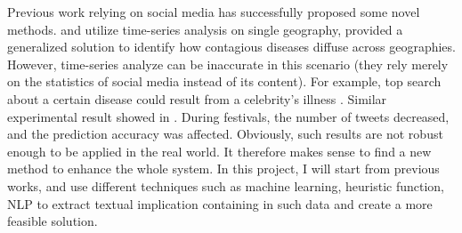 Previous work relying on social media has successfully proposed some novel methods. \cite{sadilek2012predicting} and \cite{salathe2011assessing} utilize time-series analysis on single geography, \cite{elkin2017network} provided a generalized solution to identify how contagious diseases diffuse across geographies. However, time-series analyze can be inaccurate in this scenario (they rely merely on the statistics of social media instead of its content). For example, top search about a certain disease could result from a celebrity’s illness \cite{schmidt2012trending}. Similar experimental result showed in \cite{elkin2017network}. During festivals, the number of tweets decreased, and the prediction accuracy was affected. Obviously, such results are not robust enough to be applied in the real world. It therefore makes sense to find a new method to enhance the whole system. In this project, I will start from previous works, and use different techniques such as machine learning, heuristic function, NLP to extract textual implication containing in such data and create a more feasible solution.
